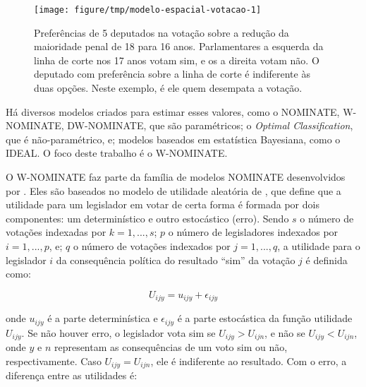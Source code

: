 \documentclass[a4paper,titlepage]{ppgi}\usepackage[]{graphicx}\usepackage[]{color}
\newenvironment{knitrout}{}{} %
\begin{document}
\begin{knitrout}
\color{fgcolor}\begin{figure}
\texttt{[image: figure/tmp/modelo-espacial-votacao-1]} \caption[Preferências de 5 deputados na votação sobre a redução da maioridade penal de 18 para 16 anos]{Preferências de 5 deputados na votação sobre a redução da maioridade penal de 18 para 16 anos.  Parlamentares a esquerda da linha de corte nos 17 anos votam sim, e os a direita votam não. O deputado com preferência sobre a linha de corte é indiferente às duas opções. Neste exemplo, é ele quem desempata a votação.}\label{fig:modelo-espacial-votacao}
\end{figure}


\end{knitrout}

Há diversos modelos criados para estimar esses valores, como o NOMINATE,
W-NOMINATE, DW-NOMINATE, que são paramétricos; o \emph{Optimal Classification},
que é não-paramétrico, e; modelos baseados em estatística Bayesiana, como o
IDEAL. O foco deste trabalho é o W-NOMINATE.
\cite{Poole1985,Poole2000,Poole2005,Jackman2000,Clinton2004}

O W-NOMINATE faz parte da família de modelos NOMINATE desenvolvidos por
. Eles são baseados no modelo de utilidade aleatória de
, que define que a utilidade para um legislador em
votar de certa forma é formada por dois componentes: um determinístico e outro
estocástico (erro). Sendo $s$ o número de votações indexadas por $k = 1, ...,
s$; $p$ o número de legisladores indexados por $i = 1, ..., p$, e; $q$ o número
de votações indexados por $j = 1, ..., q$, a utilidade para o legislador $i$ da
consequência política do resultado ``sim'' da votação $j$ é definida como:

\begin{equation}
\label{eq:random-utility}
 U_{ijy} = u_{ijy} + \epsilon_{ijy}
\end{equation}

onde $u_{ijy}$ é a parte determinística e $\epsilon_{ijy}$ é a parte
estocástica da função utilidade $U_{ijy}$. Se não houver erro, o legislador vota sim se
$U_{ijy} > U_{ijn}$, e não se $U_{ijy} < U_{ijn}$, onde $y$ e $n$ representam as
consequências de um voto sim ou não, respectivamente. Caso $U_{ijy} = U_{ijn}$,
ele é indiferente ao resultado. Com o erro, a diferença entre as utilidades é:
\end{document}

